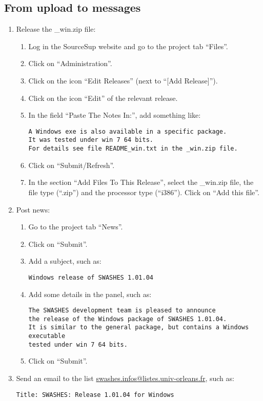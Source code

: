 \documentclass[a4paper, 11pt]{article}
\begin{document}
\subsection{From upload to messages}
\begin{enumerate}
\item Release the \_win.zip file:
\begin{enumerate}
\item Log in the SourceSup website and go to the project tab ``Files''.
\item Click on ``Administration''.
\item Click on the icon ``Edit Releases'' (next to ``[Add Release]'').
\item Click on the icon ``Edit'' of the relevant release.
\item In the field ``Paste The Notes In:'', add something like:
\begin{verbatim}
A Windows exe is also available in a specific package.
It was tested under win 7 64 bits.
For details see file README_win.txt in the _win.zip file.
\end{verbatim}
\item Click on ``Submit/Refresh''.
\item In the section ``Add Files To This Release'', select the \_win.zip file,
the file type (``.zip'') and the processor type  (``i386''). Click on ``Add this file''.
\end{enumerate}
\item Post news:
\begin{enumerate}
\item Go to the project tab ``News''.
\item Click on ``Submit''.
\item Add a subject, such as:
\begin{verbatim}
Windows release of SWASHES 1.01.04 
\end{verbatim}
\item Add some details in the panel, such as:
\begin{verbatim}
The SWASHES development team is pleased to announce
the release of the Windows package of SWASHES 1.01.04.
It is similar to the general package, but contains a Windows executable
tested under win 7 64 bits.
\end{verbatim}
\item Click on ``Submit''.
\end{enumerate}
\item Send an email to the list
\href{mailto:swashes.infos@listes.univ-orleans.fr}{swashes.infos@listes.univ-orleans.fr}, such as:
\begin{verbatim}
Title: SWASHES: Release 1.01.04 for Windows


\end{verbatim}
\end{enumerate}
\end{document}
